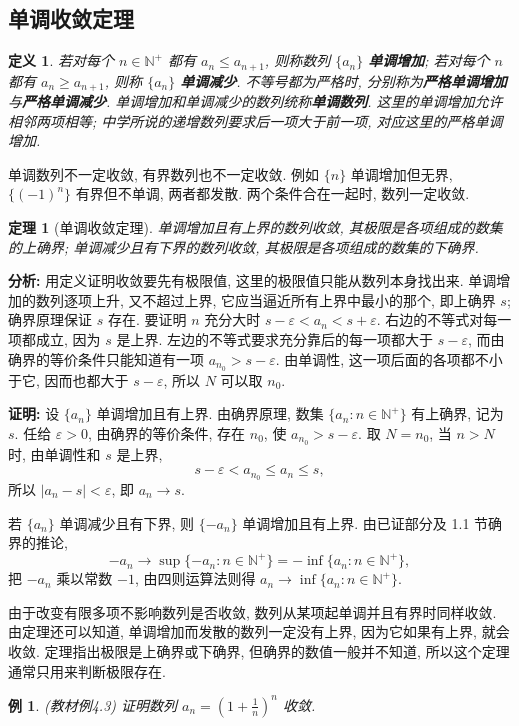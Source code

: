 \documentclass[UTF8,openany]{ctexbook}
\theoremstyle{chinesetextbook}
\newtheorem{definition}{定义}[section]
\newtheorem{example}{例}[section]
\newtheorem{theorem}{定理}[section]
\newenvironment{cnproof}{\par\indent\textbf{证明:} \ignorespaces}{\par}
\begin{document}
\subsection{单调收敛定理}
\begin{definition}
若对每个 $n\in\mathbb N^+$ 都有 $a_n\le a_{n+1}$, 则称数列 $\{a_n\}$ \textbf{单调增加}; 若对每个 $n$ 都有 $a_n\ge a_{n+1}$, 则称 $\{a_n\}$ \textbf{单调减少}. 不等号都为严格时, 分别称为\textbf{严格单调增加}与\textbf{严格单调减少}. 单调增加和单调减少的数列统称\textbf{单调数列}. 这里的单调增加允许相邻两项相等; 中学所说的递增数列要求后一项大于前一项, 对应这里的严格单调增加.
\end{definition}
单调数列不一定收敛, 有界数列也不一定收敛. 例如 $\{n\}$ 单调增加但无界, $\{(-1)^n\}$ 有界但不单调, 两者都发散. 两个条件合在一起时, 数列一定收敛.
\begin{theorem}[单调收敛定理]
单调增加且有上界的数列收敛, 其极限是各项组成的数集的上确界; 单调减少且有下界的数列收敛, 其极限是各项组成的数集的下确界.
\end{theorem}
\par\indent\textbf{分析:} 用定义证明收敛要先有极限值, 这里的极限值只能从数列本身找出来. 单调增加的数列逐项上升, 又不超过上界, 它应当逼近所有上界中最小的那个, 即上确界 $s$; 确界原理保证 $s$ 存在. 要证明 $n$ 充分大时 $s-\varepsilon<a_n<s+\varepsilon$. 右边的不等式对每一项都成立, 因为 $s$ 是上界. 左边的不等式要求充分靠后的每一项都大于 $s-\varepsilon$, 而由确界的等价条件只能知道有一项 $a_{n_0}>s-\varepsilon$. 由单调性, 这一项后面的各项都不小于它, 因而也都大于 $s-\varepsilon$, 所以 $N$ 可以取 $n_0$.
\begin{cnproof}
设 $\{a_n\}$ 单调增加且有上界. 由确界原理, 数集 $\{a_n:n\in\mathbb N^+\}$ 有上确界, 记为 $s$. 任给 $\varepsilon>0$, 由确界的等价条件, 存在 $n_0$, 使 $a_{n_0}>s-\varepsilon$. 取 $N=n_0$, 当 $n>N$ 时, 由单调性和 $s$ 是上界,
\[
s-\varepsilon<a_{n_0}\le a_n\le s,
\]
所以 $|a_n-s|<\varepsilon$, 即 $a_n\to s$.

若 $\{a_n\}$ 单调减少且有下界, 则 $\{-a_n\}$ 单调增加且有上界. 由已证部分及 1.1 节确界的推论,
\[
-a_n\to\sup\{-a_n:n\in\mathbb N^+\}=-\inf\{a_n:n\in\mathbb N^+\},
\]
把 $-a_n$ 乘以常数 $-1$, 由四则运算法则得 $a_n\to\inf\{a_n:n\in\mathbb N^+\}$.
\end{cnproof}
由于改变有限多项不影响数列是否收敛, 数列从某项起单调并且有界时同样收敛. 由定理还可以知道, 单调增加而发散的数列一定没有上界, 因为它如果有上界, 就会收敛. 定理指出极限是上确界或下确界, 但确界的数值一般并不知道, 所以这个定理通常只用来判断极限存在.
\begin{example}\label{ex:4-3}
\textnormal{(教材例4.3)} 证明数列 $\displaystyle a_n=\left(1+\frac1n\right)^n$ 收敛.
\end{example}
\end{document}
